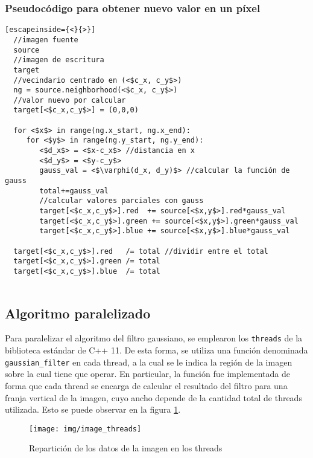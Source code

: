 \documentclass {article}
\begin{document}
\subsubsection{Pseudocódigo para obtener nuevo valor en un píxel}
\label{sec:pseudocodePixel}

\begin{lstlisting}[escapeinside={<}{>}]
  //imagen fuente
  source
  //imagen de escritura
  target
  //vecindario centrado en (<$c_x, c_y$>)
  ng = source.neighborhood(<$c_x, c_y$>) 
  //valor nuevo por calcular
  target[<$c_x,c_y$>] = (0,0,0)

  for <$x$> in range(ng.x_start, ng.x_end):
     for <$y$> in range(ng.y_start, ng.y_end):
        <$d_x$> = <$x-c_x$> //distancia en x
        <$d_y$> = <$y-c_y$>
        gauss_val = <$\varphi(d_x, d_y)$> //calcular la función de gauss
        total+=gauss_val
        //calcular valores parciales con gauss
        target[<$c_x,c_y$>].red  += source[<$x,y$>].red*gauss_val 
        target[<$c_x,c_y$>].green += source[<$x,y$>].green*gauss_val
        target[<$c_x,c_y$>].blue += source[<$x,y$>].blue*gauss_val
  
  target[<$c_x,c_y$>].red   /= total //dividir entre el total
  target[<$c_x,c_y$>].green /= total
  target[<$c_x,c_y$>].blue  /= total
        
\end{lstlisting}

\subsection{Algoritmo paralelizado}
Para paralelizar el algoritmo del filtro gaussiano, se emplearon los \texttt{threads} de la
biblioteca estándar de C++ 11. %
De esta forma, se utiliza una función denominada
\texttt{gaussian\_filter} en cada thread, a la cual se le indica la región de la imagen sobre la
cual tiene que operar. En particular, la función fue implementada de forma que cada thread se
encarga de calcular el resultado del filtro para una franja vertical de la imagen, cuyo ancho
depende de la cantidad total de threads utilizada. Esto se puede observar en la figura
\ref{fig:image_threads}.


\begin{figure}[ht]
  \centering
  \texttt{[image: img/image\_threads]}
  \caption{\label{fig:image_threads}Repartición de los datos de la imagen en los threads}
\end{figure}
\end{document}

